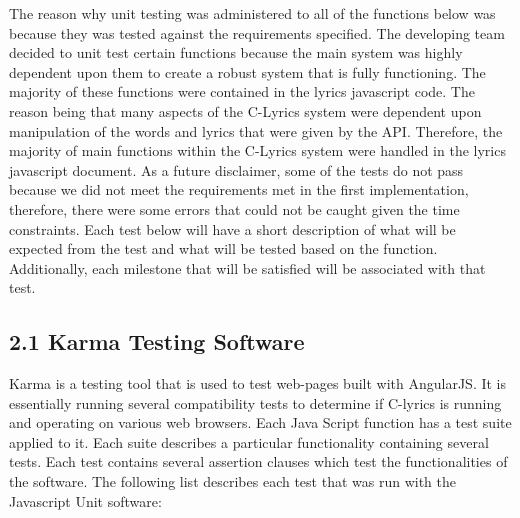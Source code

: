 \documentclass[]{article}
\begin{document}
The reason why unit testing was administered to all of the functions
below was because they was tested against the requirements specified.
The developing team decided to unit test certain functions because the
main system was highly dependent upon them to create a robust system
that is fully functioning. The majority of these functions were
contained in the lyrics javascript code. The reason being that many
aspects of the C-Lyrics system were dependent upon manipulation of the
words and lyrics that were given by the API. Therefore, the majority of
main functions within the C-Lyrics system were handled in the lyrics
javascript document. As a future disclaimer, some of the tests do not
pass because we did not meet the requirements met in the first
implementation, therefore, there were some errors that could not be
caught given the time constraints. Each test below will have a short
description of what will be expected from the test and what will be
tested based on the function. Additionally, each milestone that will be
satisfied will be associated with that test.


\subsection{\textbf{2.1 Karma Testing
Software}}\label{karma-testing-software}

Karma is a testing tool that is used to test web-pages built with
AngularJS. It is essentially running several compatibility tests to
determine if C-lyrics is running and operating on various web browsers.
Each Java Script function has a test suite applied to it. Each suite
describes a particular functionality containing several tests. Each test
contains several assertion clauses which test the functionalities of the
software. The following list describes each test that was run with the
Javascript Unit software:
\end{document}
